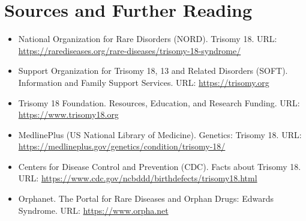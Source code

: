 \section*{Sources and Further Reading}
\begin{itemize}
    \item National Organization for Rare Disorders (NORD). Trisomy 18. URL: \url{https://rarediseases.org/rare-diseases/trisomy-18-syndrome/}
    \item Support Organization for Trisomy 18, 13 and Related Disorders (SOFT). Information and Family Support Services. URL: \url{https://trisomy.org}
    \item Trisomy 18 Foundation. Resources, Education, and Research Funding. URL: \url{https://www.trisomy18.org}
    \item MedlinePlus (US National Library of Medicine). Genetics: Trisomy 18. URL: \url{https://medlineplus.gov/genetics/condition/trisomy-18/}
    \item Centers for Disease Control and Prevention (CDC). Facts about Trisomy 18. URL: \url{https://www.cdc.gov/ncbddd/birthdefects/trisomy18.html}
    \item Orphanet. The Portal for Rare Diseases and Orphan Drugs: Edwards Syndrome. URL: \url{https://www.orpha.net}
\end{itemize}